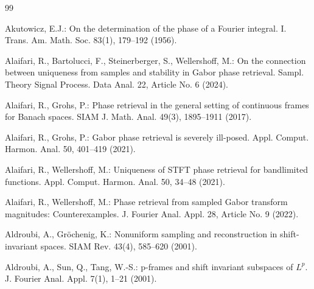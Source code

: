 \documentclass[11pt, reqno]{amsart}
\numberwithin{equation}{section}
\begin{document}
\medskip 

\begin{thebibliography}{99}

\medskip 

Akutowicz, E.J.: On the determination of the phase of a Fourier integral. I. Trans. Am. Math. Soc. 83(1), 179--192 (1956).


Alaifari, R., Bartolucci, F., Steinerberger, S., Wellershoff, M.: On the connection between uniqueness from samples and stability in Gabor phase retrieval. Sampl. Theory Signal Process. Data Anal. 22,  Article No. 6 (2024).
    
Alaifari, R., Grohs, P.:  Phase retrieval in the general setting of continuous frames for Banach spaces. SIAM J. Math. Anal. 49(3), 1895--1911 (2017).

Alaifari, R., Grohs, P.: Gabor phase retrieval is severely ill-posed. Appl. Comput. Harmon. Anal. 50, 401--419 (2021).

	Alaifari, R., Wellershoff, M.: Uniqueness of STFT phase retrieval for bandlimited functions. Appl. Comput. Harmon. Anal. 50, 34--48 (2021).

Alaifari, R., Wellershoff, M.: Phase retrieval from sampled Gabor transform magnitudes: Counterexamples. J. Fourier Anal. Appl. 28,  Article No. 9 (2022).



Aldroubi, A., Gr{\"o}chenig, K.: Nonuniform sampling and reconstruction in shift-invariant spaces. SIAM Rev. 43(4), 585--620 (2001).

Aldroubi, A., Sun, Q., Tang, W.-S.: p-frames and shift invariant
subspaces of $L^p$. J. Fourier Anal. Appl. 7(1), 1--21 (2001).


\end{thebibliography}
\end{document}
